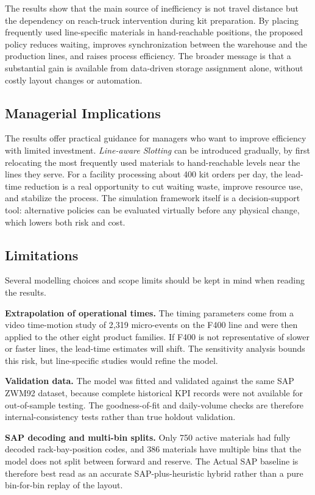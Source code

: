 \documentclass[conference]{IEEEtran}
\newcommand{\policy}[1]{\textit{#1}}
\begin{document}
The results show that the main source of inefficiency is not travel distance
but the dependency on reach-truck intervention during kit preparation. By
placing frequently used line-specific materials in hand-reachable positions,
the proposed policy reduces waiting, improves synchronization between the
warehouse and the production lines, and raises process efficiency. The broader
message is that a substantial gain is available from data-driven storage
assignment alone, without costly layout changes or automation.

\subsection{Managerial Implications}
The results offer practical guidance for managers who want to improve
efficiency with limited investment. \policy{Line-aware Slotting} can be
introduced gradually, by first relocating the most frequently used materials
to hand-reachable levels near the lines they serve. For a facility processing
about 400 kit orders per day, the lead-time reduction is a real opportunity to
cut waiting waste, improve resource use, and stabilize the process. The
simulation framework itself is a decision-support tool: alternative policies
can be evaluated virtually before any physical change, which lowers both risk
and cost.

\subsection{Limitations}
Several modelling choices and scope limits should be kept in mind when reading
the results.

\textbf{Extrapolation of operational times.} The timing parameters come from a
video time-motion study of 2{,}319 micro-events on the F400 line and were then
applied to the other eight product families. If F400 is not representative of
slower or faster lines, the lead-time estimates will shift. The sensitivity
analysis bounds this risk, but line-specific studies would refine the model.

\textbf{Validation data.} The model was fitted and validated against the same
SAP ZWM92 dataset, because complete historical KPI records were not available
for out-of-sample testing. The goodness-of-fit and daily-volume checks are
therefore internal-consistency tests rather than true holdout validation.

\textbf{SAP decoding and multi-bin splits.} Only 750 active materials had
fully decoded rack-bay-position codes, and 386 materials have multiple bins
that the model does not split between forward and reserve. The Actual SAP
baseline is therefore best read as an accurate SAP-plus-heuristic hybrid
rather than a pure bin-for-bin replay of the layout.
\end{document}
